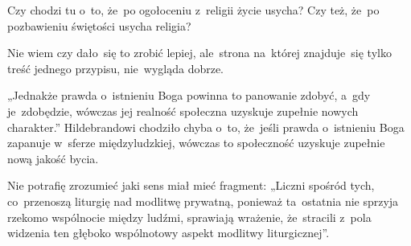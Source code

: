 \documentclass[a4paper,11pt]{article}
\numberwithin{equation}{section}
\begin{document}
\noindent
{} Czy chodzi tu o~to, że~po ogołoceniu z~religii życie
usycha? Czy też, że~po pozbawieniu świętości usycha religia?

\VerSpaceFour





\noindent
{} Nie wiem czy dało~się to zrobić lepiej, ale~strona na~której
znajduje~się tylko treść jednego przypisu, nie~wygląda dobrze.

\VerSpaceFour





\noindent
{} „Jednakże prawda o~istnieniu Boga powinna to panowanie zdobyć,
a~gdy je~zdobędzie, wówczas jej realność społeczna uzyskuje zupełnie nowych
charakter.” Hildebrandowi chodziło chyba o~to, że~jeśli prawda o~istnieniu
Boga zapanuje w~sferze międzyludzkiej, wówczas to społeczność uzyskuje
zupełnie nową jakość bycia.

\VerSpaceFour





\noindent
{} Nie potrafię zrozumieć jaki sens miał mieć fragment: „Liczni
spośród tych, co~przenoszą liturgię nad modlitwę prywatną, ponieważ
ta~ostatnia nie sprzyja rzekomo wspólnocie między ludźmi, sprawiają
wrażenie, że~stracili z~pola widzenia ten głęboko wspólnotowy aspekt
modlitwy liturgicznej”.





\VerSpaceTwo


\end{document}
